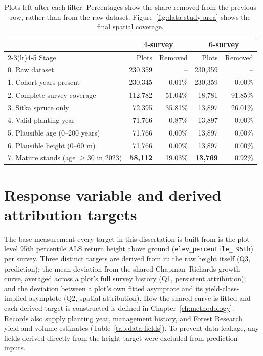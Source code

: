 \documentclass[logo,msc,ai]{infthesis}           %
\begin{document}
\begin{table}[!htbp]
\centering
\scriptsize
\begin{tabular}{lrrrr}
\toprule
& \multicolumn{2}{c}{4-survey} & \multicolumn{2}{c}{6-survey} \\
\cmidrule(lr){2-3}\cmidrule(lr){4-5}
Stage & Plots & Removed & Plots & Removed \\
\midrule
0. Raw dataset
& 230,359 & -- & 230,359 & -- \\
1. Cohort years present
& 230,345 & 0.01\% & 230,359 & 0.00\% \\
2. Complete survey coverage
& 112,782 & 51.04\% & 18,781 & 91.85\% \\
3. Sitka spruce only
& 72,395 & 35.81\% & 13,897 & 26.01\% \\
4. Valid planting year
& 71,766 & 0.87\% & 13,897 & 0.00\% \\
5. Plausible age (0--200 years)
& 71,766 & 0.00\% & 13,897 & 0.00\% \\
6. Plausible height (0--60 m)
& 71,766 & 0.00\% & 13,897 & 0.00\% \\
7. Mature stands (age $\geq 30$ in 2023)
& \textbf{58,112} & 19.03\%
& \textbf{13,769} & 0.92\% \\
\bottomrule
\end{tabular}
\caption{\small{Plots left after each filter. Percentages show the share removed from the previous row, rather than from the raw dataset. Figure~\ref{fig:data-study-area} shows the final spatial coverage.}}
\label{tab:data-cleaning-funnel}
\end{table}

\section{Response variable and derived attribution targets}

The base measurement every target in this dissertation is built from is the plot-level 95th
percentile ALS return height above ground (\texttt{elev\_\allowbreak percentile\_\allowbreak
95th}) per survey. Three distinct targets are derived from it: the raw height itself (Q3,
prediction); the mean deviation from the shared Chapman--Richards growth curve, averaged across
a plot's full survey history (Q1, persistent attribution); and the deviation between a plot's
own fitted asymptote and its yield-class-implied asymptote (Q2, spatial attribution). How the
shared curve is fitted and each derived target is constructed is defined in
Chapter~\ref{ch:methodology}. Records also supply planting year, management history, and Forest
Research yield and volume estimates (Table~\ref{tab:data-fields}). To prevent data leakage, any
fields derived directly from the height target were excluded from prediction inputs.
\end{document}
